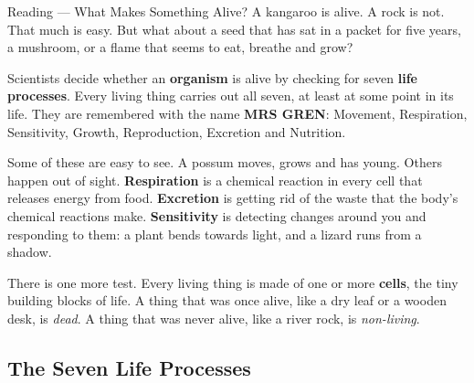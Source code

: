 \begin{readingbox}{Reading --- What Makes Something Alive?}
A kangaroo is alive. A rock is not. That much is easy. But what about a seed that has sat in a packet for five years, a mushroom, or a flame that seems to eat, breathe and grow?

Scientists decide whether an \textbf{organism} is alive by checking for seven \textbf{life processes}. Every living thing carries out all seven, at least at some point in its life. They are remembered with the name \textbf{MRS GREN}: Movement, Respiration, Sensitivity, Growth, Reproduction, Excretion and Nutrition.

Some of these are easy to see. A possum moves, grows and has young. Others happen out of sight. \textbf{Respiration} is a chemical reaction in every cell that releases energy from food. \textbf{Excretion} is getting rid of the waste that the body's chemical reactions make. \textbf{Sensitivity} is detecting changes around you and responding to them: a plant bends towards light, and a lizard runs from a shadow.

There is one more test. Every living thing is made of one or more \textbf{cells}, the tiny building blocks of life. A thing that was once alive, like a dry leaf or a wooden desk, is \emph{dead}. A thing that was never alive, like a river rock, is \emph{non-living}.
\end{readingbox}

\rcreset
{}

\label{theory:1}

\subsection{The Seven Life Processes}\label{sub:1.1}

\begin{center}
\end{center}


